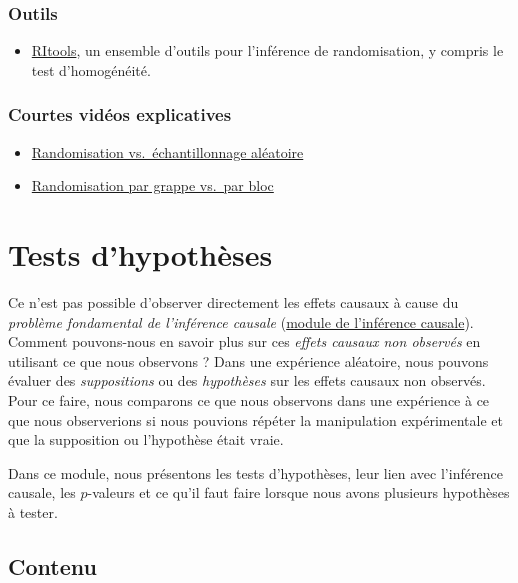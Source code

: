 \documentclass[
  12pt,
]{book}
\providecommand{\tightlist}{%
  \setlength{\itemsep}{0pt}\setlength{\parskip}{0pt}}
\begin{document}
\hypertarget{outils-1}{%
\subsection{Outils}\label{outils-1}}

\begin{itemize}
\tightlist
\item
  \href{https://cran.r-project.org/web/packages/RItools/index.html}{RItools}, un ensemble d'outils pour l'inférence de randomisation, y compris le test d'homogénéité.
\end{itemize}

\hypertarget{courtes-viduxe9os-explicatives}{%
\subsection{Courtes vidéos explicatives}\label{courtes-viduxe9os-explicatives}}

\begin{itemize}
\item
  \href{https://www.youtu.be/02A61b3hxvA}{Randomisation vs.~échantillonnage aléatoire}
\item
  \href{https://www.youtu.be/bL2U9z8hX1k}{Randomisation par grappe vs.~par bloc}
\end{itemize}

\hypertarget{tests-dhypothuxe8ses}{%
\chapter{Tests d'hypothèses}\label{tests-dhypothuxe8ses}}

Ce n'est pas possible d'observer directement les effets causaux à cause du \emph{problème fondamental de l'inférence causale} (\href{causal-inference.html}{module de l'inférence causale}).
Comment pouvons-nous en savoir plus sur ces \emph{effets causaux non observés} en utilisant ce que nous observons ?
Dans une expérience aléatoire, nous pouvons évaluer des \emph{suppositions} ou des \emph{hypothèses} sur les effets causaux non observés.
Pour ce faire, nous comparons ce que nous observons dans une expérience à ce que nous observerions si nous pouvions répéter la manipulation expérimentale et que la supposition ou l'hypothèse était vraie.

Dans ce module, nous présentons les tests d'hypothèses, leur lien avec l'inférence causale, les \(p\)-valeurs et ce qu'il faut faire lorsque nous avons plusieurs hypothèses à tester.

\hypertarget{contenu-3}{%
\section{Contenu}\label{contenu-3}}
\end{document}
